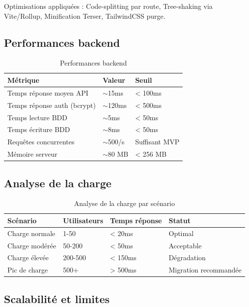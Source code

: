 Optimisations appliquées : Code-splitting par route, Tree-shaking via Vite/Rollup, Minification Terser, TailwindCSS purge.

\subsection{Performances backend}

\begin{table}[H]
\centering
\caption{Performances backend}
\label{tab:perf-backend}
\begin{tabular}{|l|l|l|}
\hline
\textbf{Métrique} & \textbf{Valeur} & \textbf{Seuil} \\
\hline
Temps réponse moyen API & $\sim$15ms & < 100ms \\
\hline
Temps réponse auth (bcrypt) & $\sim$120ms & < 500ms \\
\hline
Temps lecture BDD & $\sim$5ms & < 50ms \\
\hline
Temps écriture BDD & $\sim$8ms & < 50ms \\
\hline
Requêtes concurrentes & $\sim$500/s & Suffisant MVP \\
\hline
Mémoire serveur & $\sim$80 MB & < 256 MB \\
\hline
\end{tabular}
\end{table}

\subsection{Analyse de la charge}

\begin{table}[H]
\centering
\caption{Analyse de la charge par scénario}
\label{tab:load-analysis}
\begin{tabular}{|l|l|l|l|}
\hline
\textbf{Scénario} & \textbf{Utilisateurs} & \textbf{Temps réponse} & \textbf{Statut} \\
\hline
Charge normale & 1-50 & < 20ms & Optimal \\
\hline
Charge modérée & 50-200 & < 50ms & Acceptable \\
\hline
Charge élevée & 200-500 & < 150ms & Dégradation \\
\hline
Pic de charge & 500+ & > 500ms & Migration recommandée \\
\hline
\end{tabular}
\end{table}

\subsection{Scalabilité et limites}

